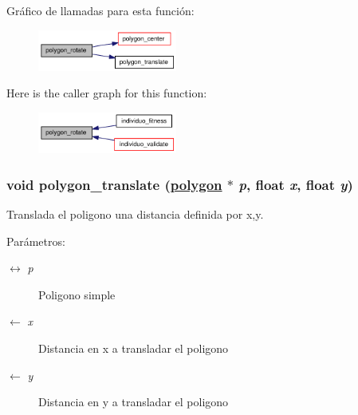 Gr\'{a}fico de llamadas para esta funci\'{o}n:\begin{figure}[H]
\begin{center}
\leavevmode
\includegraphics[width=130pt]{group__geometry_g95276abee7240f116afaf80a3e1f23c4_g95276abee7240f116afaf80a3e1f23c4_cgraph}
\end{center}
\end{figure}


Here is the caller graph for this function:\begin{figure}[H]
\begin{center}
\leavevmode
\includegraphics[width=130pt]{group__geometry_g95276abee7240f116afaf80a3e1f23c4_g95276abee7240f116afaf80a3e1f23c4_icgraph}
\end{center}
\end{figure}
\hypertarget{group__geometry_g7538c2bf0d1e8acc0cfc055b6bf3a96b_g7538c2bf0d1e8acc0cfc055b6bf3a96b}{
\subsubsection[polygon\_\-translate]{\setlength{\rightskip}{0pt plus 5cm}void polygon\_\-translate (\hyperlink{struct__polygon}{polygon} $\ast$ {\em p}, float {\em x}, float {\em y})}}
\label{group__geometry_g7538c2bf0d1e8acc0cfc055b6bf3a96b_g7538c2bf0d1e8acc0cfc055b6bf3a96b}


Translada el poligono una distancia definida por x,y.

\begin{Desc}
\item[Par\'{a}metros:]
\begin{description}
\item[\mbox{$\leftrightarrow$} {\em p}]Poligono simple \item[\mbox{$\leftarrow$} {\em x}]Distancia en x a transladar el poligono \item[\mbox{$\leftarrow$} {\em y}]Distancia en y a transladar el poligono \end{description}
\end{Desc}


